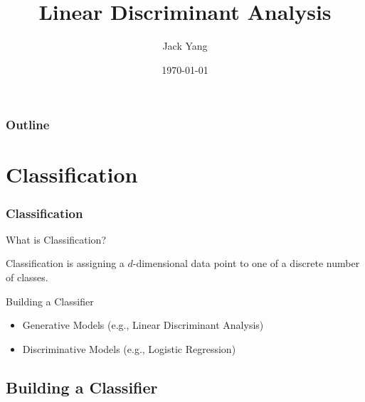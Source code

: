 \documentclass[aspectratio = 169]{beamer}
\author{Jack Yang}
\title{Linear Discriminant Analysis}
\date{\today}
\begin{document}
\frame[plain]{\titlepage}

\begin{frame}

\frametitle{Outline}
\tableofcontents

\end{frame}

\section{Classification}

\begin{frame}
\frametitle{Classification}

What is Classification?


\vspace{0.4cm}

Classification is assigning a $d$-dimensional data point to one of a discrete number of classes.


\vspace{0.4cm}

Building a Classifier


\begin{itemize}


\item Generative Models (e.g., Linear Discriminant Analysis)


\item Discriminative Models (e.g., Logistic Regression)



\end{itemize}

\end{frame}

\subsection{Building a Classifier}
\end{document}
